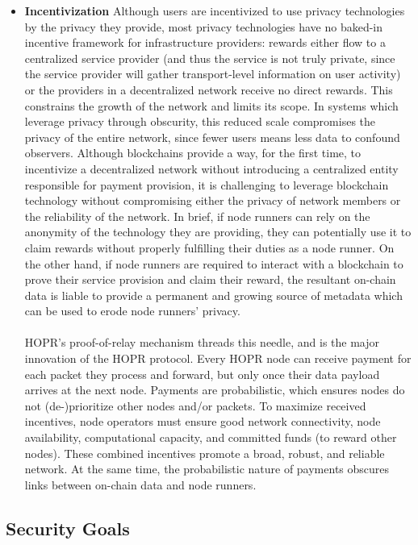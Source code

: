 \begin{itemize}
    \item \textbf{Incentivization} Although users are incentivized to use privacy technologies by the privacy they provide, most privacy technologies have no baked-in incentive framework for infrastructure providers: rewards either flow to a centralized service provider (and thus the service is not truly private, since the service provider will gather transport-level information on user activity) or the providers in a decentralized network receive no direct rewards. This constrains the growth of the network and limits its scope. In systems which leverage privacy through obscurity, this reduced scale compromises the privacy of the entire network, since fewer users means less data to confound observers. Although blockchains provide a way, for the first time, to incentivize a decentralized network without introducing a centralized entity responsible for payment provision, it is challenging to leverage blockchain technology without compromising either the privacy of network members or the reliability of the network. In brief, if node runners can rely on the anonymity of the technology they are providing, they can potentially use it to claim rewards without properly fulfilling their duties as a node runner. On the other hand, if node runners are required to interact with a blockchain to prove their service provision and claim their reward, the resultant on-chain data is liable to provide a permanent and growing source of metadata which can be used to erode node runners' privacy.  
    \\~\\HOPR's proof-of-relay mechanism threads this needle, and is the major innovation of the HOPR protocol. Every HOPR node can receive payment for each packet they process and forward, but only once their data payload arrives at the next node. Payments are probabilistic, which ensures nodes do not
        (de-)prioritize other nodes and/or packets. To maximize received incentives, node operators must ensure good network connectivity, node availability, computational capacity, and committed funds (to reward other nodes). These combined incentives promote a broad, robust, and reliable network. At the same time, the probabilistic nature of payments obscures links between on-chain data and node runners.

\end{itemize}

\subsection{Security Goals}
\label{sec:securitygoals}

